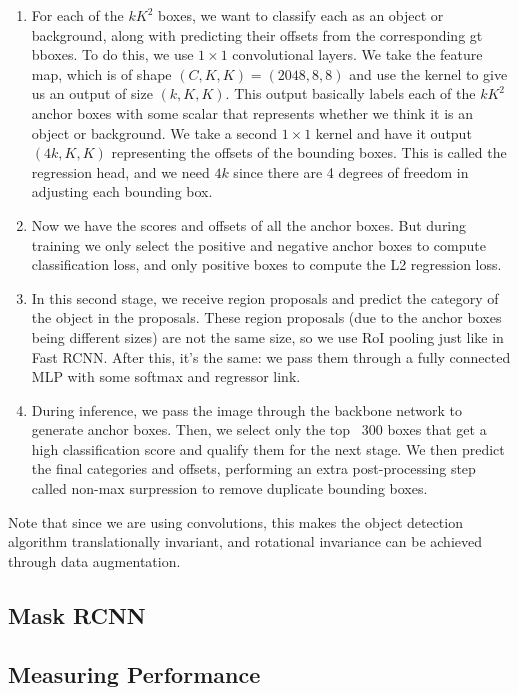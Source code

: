 \begin{enumerate}
      \item For each of the $k K^2$ boxes, we want to classify each as an object or background, along with predicting their offsets from the corresponding gt bboxes. To do this, we use $1 \times 1$ convolutional layers. We take the feature map, which is of shape $(C, K, K) = (2048, 8, 8)$ and use the kernel to give us an output of size $(k, K, K)$. This output basically labels each of the $k K^2$ anchor boxes with some scalar that represents whether we think it is an object or background. We take a second $1 \times 1$ kernel and have it output $(4k, K, K)$ representing the offsets of the bounding boxes. This is called the regression head, and we need $4k$ since there are 4 degrees of freedom in adjusting each bounding box. 
      
      \item Now we have the scores and offsets of all the anchor boxes. But during training we only select the positive and negative anchor boxes to compute classification loss, and only positive boxes to compute the L2 regression loss. 

      \item In this second stage, we receive region proposals and predict the category of the object in the proposals. These region proposals (due to the anchor boxes being different sizes) are not the same size, so we use RoI pooling just like in Fast RCNN. After this, it's the same: we pass them through a fully connected MLP with some softmax and regressor link. 

      \item During inference, we pass the image through the backbone network to generate anchor boxes. Then, we select only the top ~300 boxes that get a high classification score and qualify them for the next stage. We then predict the final categories and offsets, performing an extra post-processing step called non-max surpression to remove duplicate bounding boxes. 
  \end{enumerate}

  Note that since we are using convolutions, this makes the object detection algorithm translationally invariant, and rotational invariance can be achieved through data augmentation. 

\subsection{Mask RCNN}

\subsection{Measuring Performance} 


